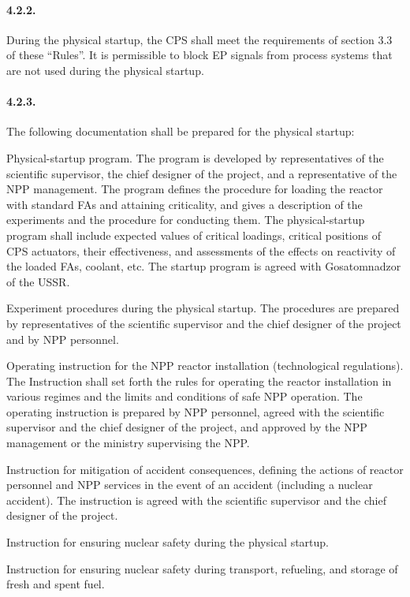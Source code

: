 \documentclass[openright]{bookest}
\begin{document}
\paragraph{4.2.2.} During the physical startup, the CPS shall meet the requirements of section 3.3 of these ``Rules''. It is permissible to block EP signals from process systems that are not used during the physical startup.

\paragraph{4.2.3.} The following documentation shall be prepared for the physical startup:

Physical-startup program. The program is developed by representatives of the scientific supervisor, the chief designer of the project, and a representative of the NPP management. The program defines the procedure for loading the reactor with standard FAs and attaining criticality, and gives a description of the experiments and the procedure for conducting them. The physical-startup program shall include expected values of critical loadings, critical positions of CPS actuators, their effectiveness, and assessments of the effects on reactivity of the loaded FAs, coolant, etc. The startup program is agreed with Gosatomnadzor of the USSR.

Experiment procedures during the physical startup. The procedures are prepared by representatives of the scientific supervisor and the chief designer of the project and by NPP personnel.

Operating instruction for the NPP reactor installation (technological regulations). The Instruction shall set forth the rules for operating the reactor installation in various regimes and the limits and conditions of safe NPP operation. The operating instruction is prepared by NPP personnel, agreed with the scientific supervisor and the chief designer of the project, and approved by the NPP management or the ministry supervising the NPP.

Instruction for mitigation of accident consequences, defining the actions of reactor personnel and NPP services in the event of an accident (including a nuclear accident). The instruction is agreed with the scientific supervisor and the chief designer of the project.

Instruction for ensuring nuclear safety during the physical startup.

Instruction for ensuring nuclear safety during transport, refueling, and storage of fresh and spent fuel.
\end{document}
